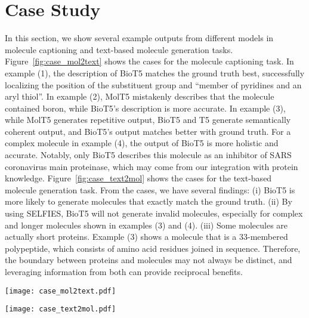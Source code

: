 \documentclass[11pt]{article}
\newcommand{\method}{{BioT5}}
\begin{document}
\section{Case Study}
\label{sec:case_study}
In this section, we show several example outputs from different models in molecule captioning and text-based molecule generation tasks.
Figure~\ref{fig:case_mol2text} shows the cases for the molecule captioning task.
In example (1), the description of \method{} matches the ground truth best, successfully localizing the position of the substituent group and ``member of pyridines and an aryl thiol''.
In example (2), MolT5 mistakenly describes that the molecule contained boron, while \method's description is more accurate.
In example (3), while MolT5 generates repetitive output, \method{} and T5 generate semantically coherent output, and \method{}'s output matches better with ground truth.
For a complex molecule in example (4), the output of \method{} is more holistic and accurate.
Notably, only \method{} describes this molecule as an inhibitor of SARS coronavirus main proteinase, which may come from our integration with protein knowledge.
Figure~\ref{fig:case_text2mol} shows the cases for the text-based molecule generation task.
From the cases, we have several findings:
(i) \method{} is more likely to generate molecules that exactly match the ground truth.
(ii) By using SELFIES, \method{} will not generate invalid molecules, especially for complex and longer molecules shown in examples (3) and (4).
(iii) Some molecules are actually short proteins. Example (3) shows a molecule that is a 33-membered polypeptide, which consists of  amino acid residues joined in sequence. Therefore, the boundary between proteins and molecules may not always be distinct, and leveraging information from both can provide reciprocal benefits.

\begin{figure*}[t]
    \centering
\texttt{[image: case\_mol2text.pdf]}
    \caption{Molecule captioning cases.}
    \label{fig:case_mol2text}
\end{figure*}

\begin{figure*}[t]
    \centering
\texttt{[image: case\_text2mol.pdf]}
    \caption{Text-based molecule generation cases.}
    \label{fig:case_text2mol}
\end{figure*}
\end{document}
